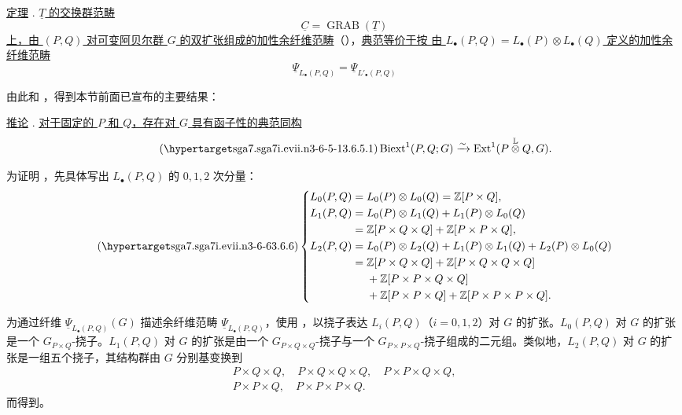 \underline{定理} . \underline{$\underline T$ 的交换群范畴}
\[
 \underline C=\operatorname{GRAB}(\underline T)
\]
\underline{上，由 $(P,Q)$ 对可变阿贝尔群 $G$ 的双扩张组成的加性余纤维范畴}（），\underline{典范等价于按  由 $L_\bullet(P,Q)=L_\bullet(P)\otimes L_\bullet(Q)$ 定义的加性余纤维范畴}
\[
 \underline\Psi_{L_\bullet(P,Q)}
 =
 \underline\Psi_{L'_\bullet(P,Q)}
\]


由此和 ，得到本节前面已宣布的主要结果：

\underline{推论} . \underline{对于固定的 $P$ 和 $Q$，存在对 $G$ 具有函子性的典范同构}
\begin{equation}\tag{\SGARefTarget{sga7.sga7i.evii.n3-6-5-1}{3.6.5.1}}
 \Biext^1(P,Q;G)
 \xrightarrow{\sim}
 \Ext^1(P\mathbin{\overset{\mathbb L}{\otimes}}Q,G).
\end{equation}


为证明 ，先具体写出 $L_\bullet(P,Q)$ 的 $0,1,2$ 次分量：
\begin{equation}\tag{\SGARefTarget{sga7.sga7i.evii.n3-6-6}{3.6.6}}
\left\{
\begin{aligned}
 L_0(P,Q)
  ={}&L_0(P)\otimes L_0(Q)
     =\mathbb Z[P\times Q],\\
 L_1(P,Q)
  ={}&L_0(P)\otimes L_1(Q)+L_1(P)\otimes L_0(Q)\\
  ={}&\mathbb Z[P\times Q\times Q]
     +\mathbb Z[P\times P\times Q],\\
 L_2(P,Q)
  ={}&L_0(P)\otimes L_2(Q)+L_1(P)\otimes L_1(Q)
     +L_2(P)\otimes L_0(Q)\\
  ={}&\mathbb Z[P\times Q\times Q]
     +\mathbb Z[P\times Q\times Q\times Q]\\
   &+\mathbb Z[P\times P\times Q\times Q]\\
   &+\mathbb Z[P\times P\times Q]
     +\mathbb Z[P\times P\times P\times Q].
\end{aligned}
\right.
\end{equation}


为通过纤维 $\underline\Psi_{L_\bullet(P,Q)}(G)$ 描述余纤维范畴 $\underline\Psi_{L_\bullet(P,Q)}$，使用 ，以挠子表达 $L_i(P,Q)$（$i=0,1,2$）对 $G$ 的扩张。$L_0(P,Q)$ 对 $G$ 的扩张是一个 $G_{P\times Q}$-挠子。$L_1(P,Q)$ 对 $G$ 的扩张是由一个 $G_{P\times Q\times Q}$-挠子与一个 $G_{P\times P\times Q}$-挠子组成的二元组。类似地，$L_2(P,Q)$ 对 $G$ 的扩张是一组五个挠子，其结构群由 $G$ 分别基变换到
\[
\begin{gathered}
 P\times Q\times Q,\quad
 P\times Q\times Q\times Q,\quad
 P\times P\times Q\times Q,\\
 P\times P\times Q,\quad
 P\times P\times P\times Q.
\end{gathered}
\]
而得到。

